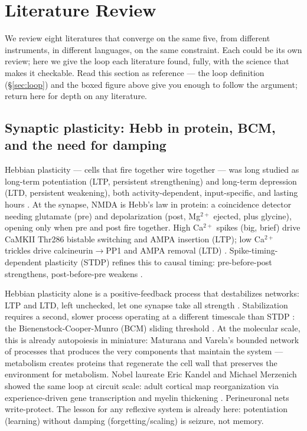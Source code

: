 \documentclass[11pt]{article}
\begin{document}
\section{Literature Review}
\label{sec:lit-review}

We review eight literatures that converge on the same five, from different instruments, in different languages, on the same constraint. Each could be its own review; here we give the loop each literature found, fully, with the science that makes it checkable. Read this section as reference --- the loop definition (\S\ref{sec:loop}) and the boxed figure above give you enough to follow the argument; return here for depth on any literature.

\subsection{Synaptic plasticity: Hebb in protein, BCM, and the need for damping}

Hebbian plasticity --- cells that fire together wire together --- was long studied as long-term potentiation (LTP, persistent strengthening) and long-term depression (LTD, persistent weakening), both activity-dependent, input-specific, and lasting hours \citep{tononi2014}. At the synapse, NMDA is Hebb's law in protein: a coincidence detector needing glutamate (pre) and depolarization (post, Mg$^{2+}$ ejected, plus glycine), opening only when pre and post fire together. High Ca$^{2+}$ spikes (big, brief) drive CaMKII Thr286 bistable switching and AMPA insertion (LTP); low Ca$^{2+}$ trickles drive calcineurin$\to$\allowbreak{}PP1 and AMPA removal (LTD) \citep{tononi2014}. Spike-timing-dependent plasticity (STDP) refines this to causal timing: pre-before-post strengthens, post-before-pre weakens \citep{bipoo1998}.

Hebbian plasticity alone is a positive-feedback process that destabilizes networks: LTP and LTD, left unchecked, let one synapse take all strength \citep{tononi2014}. Stabilization requires a second, slower process operating at a different timescale than STDP \citep{tononi2014}: the Bienenstock-Cooper-Munro (BCM) sliding threshold \citep{bienenstock1982}. At the molecular scale, this is already autopoiesis in miniature: Maturana and Varela's bounded network of processes that produces the very components that maintain the system \citep{maturana1980} --- metabolism creates proteins that regenerate the cell wall that preserves the environment for metabolism. Nobel laureate Eric Kandel and Michael Merzenich showed the same loop at circuit scale: adult cortical map reorganization via experience-driven gene transcription and myelin thickening \citep{kandel2001,merzenich1984}. Perineuronal nets write-protect. The lesson for any reflexive system is already here: potentiation (learning) without damping (forgetting/scaling) is seizure, not memory.
\end{document}
